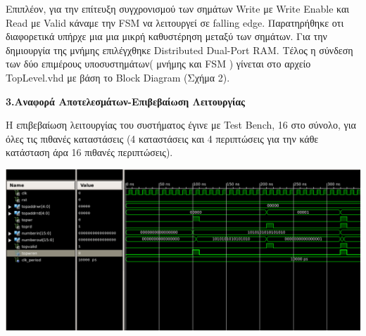 \documentclass{article}
\begin{document}
\newpage

\begin{justify}
\hspace{1.5em}
Επιπλέον, για την επίτευξη συγχρονισμού των σημάτων Write με Write Enable και Read με Valid κάναμε την FSM να λειτουργεί σε falling edge. Παρατηρήθηκε οτι διαφορετικά υπήρχε μια μια μικρή καθυστέρηση μεταξύ των σημάτων. Για την δημιουργία της μνήμης επιλέγχθηκε Distributed Dual-Port RAM. Τέλος η σύνδεση των δύο επιμέρους υποσυστημάτων( μνήμης και FSM ) γίνεται στο αρχείο TopLevel.vhd με βάση το Block Diagram (Σχήμα 2).
\end{justify}

\vspace{0.5cm}

{ \large \bfseries 3.Αναφορά Αποτελεσμάτων-Επιβεβαίωση Λειτουργίας}\\ %

\begin{justify}
\hspace{1.5em}
Η επιβεβαίωση λειτουργίας του συστήματος έγινε με Test Bench, 16 στο σύνολο, για όλες τις πιθανές καταστάσεις (4 καταστάσεις και 4 περιπτώσεις για την κάθε κατάσταση άρα 16 πιθανές περιπτώσεις).
\end{justify}

\begin{center}
    \centering
    \hspace*{-1.8cm} %
    \includegraphics[width=1.2\textwidth]{Images/Screenshot_1.png} %
    \captionsetup{font=footnotesize} %
    \label{fig:third_image}
\end{center}
\end{document}
